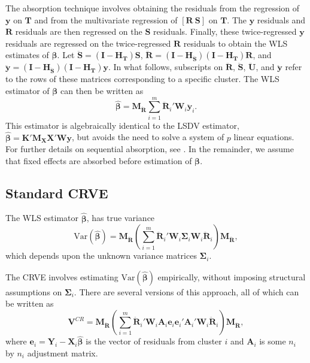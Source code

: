 \documentclass[12pt]{article}\usepackage[]{graphicx}\usepackage[]{color}
\newcommand{\Var}{\text{Var}}
\newcommand{\bm}{\mathbf}
\newcommand{\bs}{\boldsymbol}
\begin{document}
The absorption technique involves obtaining the residuals from the regression of $\bm{y}$ on $\bm{T}$ and from the multivariate regression of $[\bm{R} \ \bm{S}]$ on $\bm{T}$. 
The $\bm{y}$ residuals and $\bm{R}$ residuals are then regressed on the $\bm{S}$ residuals. 
Finally, these twice-regressed $\bm{y}$ residuals are regressed on the twice-regressed $\bm{R}$ residuals to obtain the WLS estimates of $\bs\beta$. 
Let $\bm{\ddot{S}} = \left(\bm{I} - \bm{H_T}\right)\bm{S}$, $\bm{\ddot{R}} = \left(\bm{I} - \bm{H_{\ddot{S}}}\right)\left(\bm{I} - \bm{H_T}\right)\bm{R}$, and $\bm{\ddot{y}} = \left(\bm{I} - \bm{H_{\ddot{S}}}\right)\left(\bm{I} - \bm{H_T}\right)\bm{y}$. 
In what follows, subscripts on $\bm{\ddot{R}}$, $\bm{\ddot{S}}$,  $\bm{\ddot{U}}$, and $\bm{\ddot{y}}$ refer to the rows of these matrices corresponding to a specific cluster. 
The WLS estimator of $\bs\beta$ can then be written as
\begin{equation}
\label{eq:WLS}
\bs{\hat\beta} = \bm{M_{\ddot{R}}} \sum_{i=1}^m \bm{\ddot{R}}_i' \bm{W}_i \bm{\ddot{y}}_i. 
\end{equation}
This estimator is algebraically identical to the LSDV estimator, $\bs{\hat\beta} = \bm{K}'\bm{M_X} \bm{X}' \bm{W} \bm{y}$, but avoids the need to solve a system of $p$ linear equations. For further details on sequential absorption, see \citet{Davis2002estimating}. In the remainder, we assume that fixed effects are absorbed before estimation of $\bs\beta$. 

\subsection{Standard CRVE}

The WLS estimator $\bs{\hat\beta}$, has true variance
\begin{equation}
\label{eq:var_WLS}
\Var\left(\bs{\hat\beta}\right) = \bm{M_{\ddot{R}}}\left(\sum_{i=1}^m \bm{\ddot{R}}_i' \bm{W}_i \bs\Sigma_i \bm{W}_i\bm{\ddot{R}}_i\right) \bm{M_{\ddot{R}}},
\end{equation}
which depends upon the unknown variance matrices $\bs\Sigma_i$. 

The CRVE involves estimating $\Var\left(\bs{\hat\beta}\right)$ empirically, without imposing structural assumptions on $\bs\Sigma_i$. 
There are several versions of this approach, all of which can be written as
\begin{equation}
\label{eq:V_small}
\bm{V}^{CR} = \bm{M_{\ddot{R}}}\left(\sum_{i=1}^m \bm{\ddot{R}}_i'\bm{W}_i \bm{A}_i \bm{e}_i \bm{e}_i' \bm{A}_i' \bm{W}_i \bm{\ddot{R}}_i\right) \bm{M_{\ddot{R}}},
\end{equation}
where $\bm{e}_i = \bm{Y}_i - \bm{X}_i \bs{\hat\beta}$ is the vector of residuals from cluster $i$ and $\bm{A}_i$ is some $n_i$ by $n_i$ adjustment matrix. 
\end{document}
